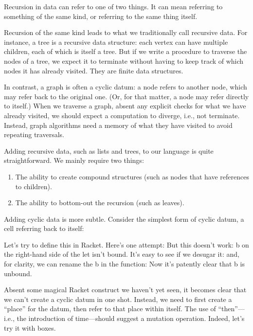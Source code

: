 
Recursion in data can refer to one of two things. It can mean referring to
something of the same kind, or referring to the same thing itself.

Recursion of the same kind leads to what we traditionally call recursive data.
For instance, a tree is a recursive data structure: each vertex can have
multiple children, each of which is itself a tree. But if we write a procedure
to traverse the nodes of a tree, we expect it to terminate without having to
keep track of which nodes it has already visited. They are finite data
structures.

In contrast, a graph is often a cyclic datum: a node refers to another node,
which may refer back to the original one. (Or, for that matter, a node may refer
directly to itself.) When we traverse a graph, absent any explicit checks for
what we have already visited, we should expect a computation to diverge, i.e.,
not terminate. Instead, graph algorithms need a memory of what they have visited
to avoid repeating traversals.

Adding recursive data, such as lists and trees, to our language is quite
straightforward. We mainly require two things:
\begin{enumerate}[nosep]
  \item 
The ability to create compound structures (such as nodes that have references to
children).
  \item 
The ability to bottom-out the recursion (such as leaves).
\end{enumerate}


Adding cyclic data is more subtle. Consider the simplest form of cyclic datum, a
cell referring back to itself:
\bigskip

Let’s try to define this in Racket. Here’s one attempt:
But this doesn’t work: b on the right-hand side of the let isn’t bound. It’s
easy to see if we desugar it:
and, for clarity, we can rename the b in the function:
Now it’s patently clear that b is unbound.

Absent some magical Racket construct we haven’t yet seen, it becomes clear that
we can’t create a cyclic datum in one shot. Instead, we need to first create a
“place” for the datum, then refer to that place within itself. The use of
“then”—i.e., the introduction of time—should suggest a mutation operation.
Indeed, let’s try it with boxes.

